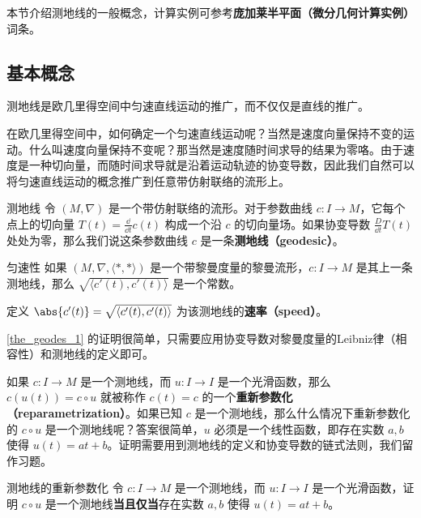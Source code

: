 

本节介绍测地线的一般概念，计算实例可参考\textbf{庞加莱半平面（微分几何计算实例）}词条。

\subsection{基本概念}

测地线是欧几里得空间中匀速直线运动的推广，而不仅仅是直线的推广。

在欧几里得空间中，如何确定一个匀速直线运动呢？当然是速度向量保持不变的运动。什么叫速度向量保持不变呢？那当然是速度随时间求导的结果为零咯。由于速度是一种切向量，而随时间求导就是沿着运动轨迹的协变导数，因此我们自然可以将匀速直线运动的概念推广到任意带仿射联络的流形上。

\begin{definition}{测地线}
令 $(M, \nabla)$ 是一个带仿射联络的流形。对于参数曲线 $c:I\to M$，它每个点上的切向量 $T(t)=\frac{\dd}{\dd t}c(t)$ 构成一个沿 $c$ 的切向量场。如果协变导数 $\frac{D}{\dd t}T(t)$ 处处为零，那么我们说这条参数曲线 $c$ 是一条\textbf{测地线（geodesic）}。
\end{definition}

\begin{theorem}{匀速性}\label{the_geodes_1}
如果 $(M, \nabla,  \langle *, * \rangle )$ 是一个带黎曼度量的黎曼流形，$c:I\to M$ 是其上一条测地线，那么 $\sqrt{ \langle c'(t), c'(t) \rangle }$ 是一个常数。

定义 $\abs{c'(t)}=\sqrt{ \langle c'(t), c'(t) \rangle }$ 为该测地线的\textbf{速率（speed）}。
\end{theorem}

\autoref{the_geodes_1} 的证明很简单，只需要应用协变导数对黎曼度量的Leibniz律（相容性）和测地线的定义即可。



如果 $c:I\to M$ 是一个测地线，而 $u:I\to I$ 是一个光滑函数，那么 $c(u(t))=c\circ u$ 就被称作 $c(t)=c$ 的一个\textbf{重新参数化（reparametrization）}。如果已知 $c$ 是一个测地线，那么什么情况下重新参数化的 $c\circ u$ 是一个测地线呢？答案很简单，$u$ 必须是一个线性函数，即存在实数 $a, b$ 使得 $u(t)=at+b$。证明需要用到测地线的定义和协变导数的链式法则，我们留作习题。

\begin{exercise}{测地线的重新参数化}
令 $c:I\to M$ 是一个测地线，而 $u:I\to I$ 是一个光滑函数，证明 $c\circ u$ 是一个测地线\textbf{当且仅当}存在实数 $a, b$ 使得 $u(t)=at+b$。
\end{exercise}

